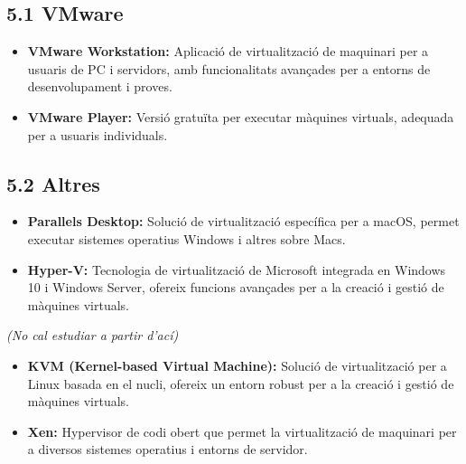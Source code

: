 \documentclass[
  spanish,
  12 pt,
  a4paper,
]{article}
\providecommand{\tightlist}{%
  \setlength{\itemsep}{0pt}\setlength{\parskip}{0pt}}
\begin{document}
\subsection{5.1 VMware}\label{vmware}

\begin{itemize}
\tightlist
\item
  \textbf{VMware Workstation:} Aplicació de virtualització de maquinari
  per a usuaris de PC i servidors, amb funcionalitats avançades per a
  entorns de desenvolupament i proves.
\item
  \textbf{VMware Player:} Versió gratuïta per executar màquines
  virtuals, adequada per a usuaris individuals.
\end{itemize}

\subsection{5.2 Altres}\label{altres-1}

\begin{itemize}
\tightlist
\item
  \textbf{Parallels Desktop:} Solució de virtualització específica per a
  macOS, permet executar sistemes operatius Windows i altres sobre Macs.
\item
  \textbf{Hyper-V:} Tecnologia de virtualització de Microsoft integrada
  en Windows 10 i Windows Server, ofereix funcions avançades per a la
  creació i gestió de màquines virtuals.
\end{itemize}

\emph{(No cal estudiar a partir d'ací)}

\begin{itemize}
\tightlist
\item
  \textbf{KVM (Kernel-based Virtual Machine):} Solució de virtualització
  per a Linux basada en el nucli, ofereix un entorn robust per a la
  creació i gestió de màquines virtuals.
\item
  \textbf{Xen:} Hypervisor de codi obert que permet la virtualització de
  maquinari per a diversos sistemes operatius i entorns de servidor.
\end{itemize}
\end{document}
